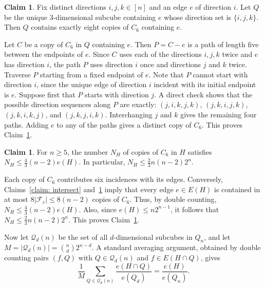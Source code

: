 \documentclass[11pt]{article}
\theoremstyle{plain}
\theoremstyle{definition}
\newtheorem{claim}[theorem]{Claim}
\begin{document}
\begin{claim}\label{claim: directions} Fix distinct directions $i,j,k \in [n]$ and an edge $e$ of direction $i$. Let $Q$ be the unique $3$-dimensional subcube containing $e$ whose direction set is $\{i,j,k\}$. Then $Q$ contains exactly eight copies of $C_6$ containing $e$. 

Let $C$ be a copy of $C_6$ in $Q$ containing $e$. 
Then $P = C - e$ is a path of length five between the endpoints of $e$. 
Since $C$ uses each of the directions $i,j,k$ twice and $e$ has direction $i$, the path $P$ uses direction $i$ once and directions $j$ and $k$ twice. 
Traverse $P$ starting from a fixed endpoint of $e$. 
Note that $P$ cannot start with direction $i$, since the unique edge of direction $i$ incident with its initial endpoint is $e$. 
Suppose first that $P$ starts with direction $j$. 
A direct check shows that the possible direction sequences along $P$ are exactly: $(j,i,k,j,k)$, $(j,k,i,j,k)$, $(j,k,i,k,j)$, and $(j,k,j,i,k)$. 
Interchanging $j$ and $k$ gives the remaining four paths. 
Adding $e$ to any of the paths gives a distinct copy of $C_6$. 
This proves Claim~\ref{claim: directions}.

\end{claim}

\begin{claim}\label{claim: N_6} For $n \geq 5$, the number $N_H$ of copies of $C_6$ in $H$ satisfies $N_H \leq \frac{4}{3}(n-2)e(H)$. In particular, $N_H \leq \frac{2}{3}n(n-2)2^n$.

Each copy of $C_6$ contributes six incidences with its edges. 
Conversely, Claims~\ref{claim: intersect} and~\ref{claim: directions} imply that every edge $e \in E(H)$ is contained in at most $8|\mathcal{F}_e| \leq 8(n-2)$ copies of $C_6$. 
Thus, by double counting, $N_H \leq \frac{4}{3}(n-2)e(H)$. 
Also, since $e(H) \leq n2^{n-1}$, it follows that $N_H \leq \frac{2}{3}n(n-2)2^n$. 
This proves Claim~\ref{claim: N_6}.

Now let $\mathcal{Q}_d(n)$ be the set of all $d$-dimensional subcubes in $Q_n$, and let $M = |\mathcal{Q}_d(n)| = \binom{n}{d}2^{n-d}$. 
A standard averaging argument, obtained by double counting pairs $(f,Q)$ with $Q \in \mathcal{Q}_d(n)$ and $f \in E(H \cap Q)$, gives 
\begin{equation}\label{equation: average}
    \frac{1}{M} \sum_{Q \in \mathcal{Q}_d(n)} \frac{e(H \cap Q)}{e(Q_d)} = \frac{e(H)}{e(Q_n)}.
\end{equation}

\end{claim}
\end{document}

